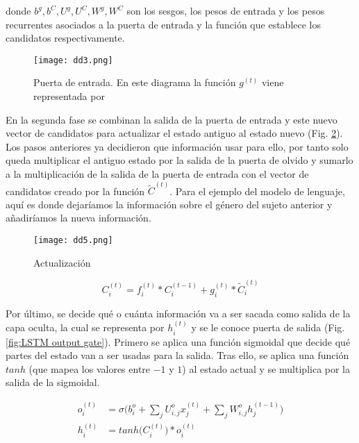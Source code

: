     
    \noindent donde $b^g, b^C, U^g, U^C, W^g, W^C$ son los sesgos, los pesos de entrada y los pesos recurrentes asociados a la puerta de entrada y la función que establece los candidatos respectivamente. \\
	    
    

	    \begin{figure}[H]
	      \centering
	      \texttt{[image: dd3.png]}
	      \caption{Puerta de entrada. En este diagrama la función $g^{(t)}$ viene representada por }
	      \label{fig:LSTM input gate}
	    \end{figure}
	  
	 \noindent En la segunda fase se combinan la salida de la puerta de entrada y este nuevo vector de candidatos para actualizar el estado antiguo al estado nuevo (Fig. \ref{fig:LSTM update}). Los pasos anteriores ya decidieron que información usar para ello, por tanto solo queda multiplicar el antiguo estado por la salida de la puerta de olvido y sumarlo a la multiplicación de la salida de la puerta de entrada con el vector de candidatos creado por la función $\tilde{C}^{(t)}$. Para el ejemplo del modelo de lenguaje, aquí es donde dejaríamos la información sobre el género del sujeto anterior y añadiríamos la nueva información. 
	 
	 
	   \begin{figure}[H]
	      \centering
	      \texttt{[image: dd5.png]}
	      \caption{Actualización}
	      \label{fig:LSTM update}
	   \end{figure}	  

    \begin{equation}
	     C^{(t)}_i = f^{(t)}_i * C^{(t-1)}_i + g^{(t)}_i * \tilde{C}_i^{(t)}
	 \end{equation}

    Por último, se decide qué o cuánta información va a ser sacada como salida de la capa oculta, la cual se representa por $h_i^{(t)}$ y se le conoce puerta de salida (Fig. \ref{fig:LSTM output gate}). Primero se aplica una función sigmoidal que decide qué partes del estado van a ser usadas para la salida. Tras ello, se aplica una función $tanh$ (que mapea los valores entre $-1$ y $1$) al estado actual y se multiplica por la salida de la sigmoidal. 
    
    \begin{equation}
    \begin{aligned}
        o^{(t)}_i & = \sigma \Big( b^o_i + \sum_j U^o_{i,j} x^{(t)}_j + \sum_j W^o_{i,j} h^{(t-1)}_j \Big) \\
        h^{(t)}_i & = tanh \big( C^{(t)}_i \big) * o^{(t)}_i
    \end{aligned}
    \end{equation}


